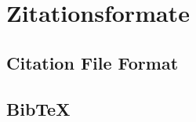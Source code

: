 \section{Zitationsformate}
\label{sec:zitationsformate}
\subsection{Citation File Format}
\label{subsec:citation-file-format}
\subsection{BibTeX}
\label{subsec:bibtex}

